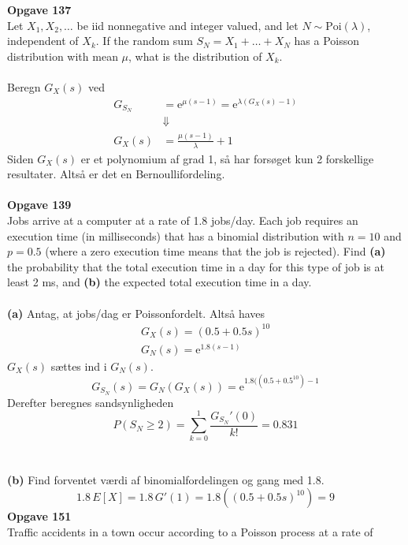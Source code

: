 \documentclass[12pt,a4paper,draft]{report}
\author{Frederik Appel Vardinghus-Nielsen}
\begin{document}
\noindent\textbf{Opgave 137}\\
Let $X_1,X_2,\ldots$ be iid nonnegative and integer valued, and let $N\sim\text{Poi}(\lambda)$, independent of $X_k$. If the random sum $S_N=X_1+\ldots+X_N$ has a Poisson distribution with mean $\mu$, what is the distribution of $X_k$.\\\\
Beregn $G_X(s)$ ved
\begin{align*}
G_{S_N}&=\mathrm{e}^{\mu(s-1)}=\mathrm{e}^{\lambda(G_X(s)-1)}\\
&\Downarrow\\
G_X(s)&=\frac{\mu(s-1)}{\lambda}+1
\end{align*}
Siden $G_X(s)$ er et polynomium af grad 1, så har forsøget kun 2 forskellige resultater. Altså er det en Bernoullifordeling.\\\\
\textbf{Opgave 139}\\
Jobs arrive at a computer at a rate of 1.8 jobs/day. Each job requires an execution
time (in milliseconds) that has a binomial distribution with $n = 10$ and
$p = 0.5$ (where a zero execution time means that the job is rejected). Find
\textbf{(a)} the probability that the total execution time in a day for this type of job is at
least 2 ms, and \textbf{(b)} the expected total execution time in a day.\\\\
\textbf{(a)} Antag, at jobs/dag er Poissonfordelt. Altså haves
\begin{align*}
G_X(s)=(0.5+0.5s)^{10}\\
G_N(s)=\mathrm{e}^{1.8(s-1)}
\end{align*}
$G_X(s)$ sættes ind i $G_N(s)$.
\begin{equation}
G_{S_N}(s)=G_N(G_X(s))=\mathrm{e}^{1.8((0.5+0.5^{10})-1}
\end{equation}
Derefter beregnes sandsynligheden
\begin{equation}
P(S_N\geq 2)=\sum_{k=0}^1\frac{G_{S_N}'(0)}{k!}=0.831
\end{equation}
\\\\
\textbf{(b)} Find forventet værdi af binomialfordelingen og gang med 1.8.
\begin{equation}
1.8\,E[X]=1.8\,G'(1)=1.8\left((0.5+0.5s)^{10}\right)=9
\end{equation}
\textbf{Opgave 151}\\
Traffic accidents in a town occur according to a Poisson process at a rate of
\end{document}
